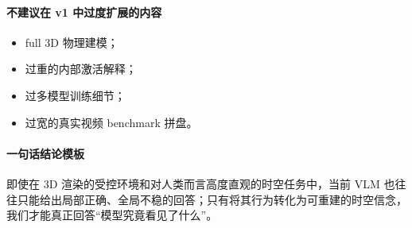 \documentclass[UTF8,12pt,fontset=none]{ctexart}
\begin{document}
\paragraph{不建议在 v1 中过度扩展的内容}
\begin{itemize}
  \item full 3D 物理建模；
  \item 过重的内部激活解释；
  \item 过多模型训练细节；
  \item 过宽的真实视频 benchmark 拼盘。
\end{itemize}

\paragraph{一句话结论模板}
即使在 3D 渲染的受控环境和对人类而言高度直观的时空任务中，当前 VLM 也往往只能给出局部正确、全局不稳的回答；只有将其行为转化为可重建的时空信念，我们才能真正回答“模型究竟看见了什么”。



\end{document}
